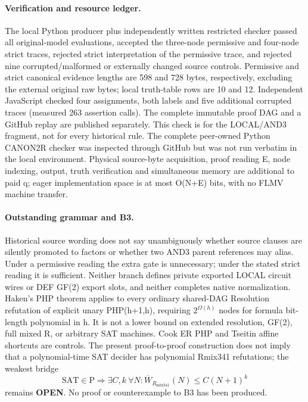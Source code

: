 \documentclass[11pt]{article}
\begin{document}
\paragraph{Verification and resource ledger.}
The local Python producer plus independently written restricted checker passed all original-model evaluations, accepted the three-node permissive and four-node strict traces, rejected strict interpretation of the permissive trace, and rejected nine corrupted/malformed or externally changed source controls. Permissive and strict canonical evidence lengths are 598 and 728 bytes, respectively, excluding the external original raw bytes; local truth-table rows are 10 and 12. Independent JavaScript checked four assignments, both labels and five additional corrupted traces (measured 263 assertion calls). The complete immutable proof DAG and a GitHub replay are published separately. This check is for the LOCAL/AND3 fragment, not for every historical rule. The complete peer-owned Python CANON2R checker was inspected through GitHub but was not run verbatim in the local environment. Physical source-byte acquisition, proof reading E, node indexing, output, truth verification and simultaneous memory are additional to paid q; eager implementation space is at most O(N+E) bits, with no FLMV machine transfer.

\paragraph{Outstanding grammar and B3.}
Historical source wording does not say unambiguously whether source clauses are silently promoted to factors or whether two AND3 parent references may alias. Under a permissive reading the extra gate is unnecessary; under the stated strict reading it is sufficient. Neither branch defines private exported LOCAL circuit wires or DEF GF(2) export slots, and neither completes native normalization. Haken's PHP theorem applies to every ordinary shared-DAG Resolution refutation of explicit unary PHP(h+1,h), requiring \(2^{\Omega(h)}\) nodes for formula bit-length polynomial in h. It is not a lower bound on extended resolution, GF(2), full mixed R, or arbitrary SAT machines. Cook ER PHP and Tseitin affine shortcuts are controls. The present proof-to-proof construction does not imply that a polynomial-time SAT decider has polynomial Rmix341 refutations; the weakest bridge
\[
\mathrm{SAT}\in\mathrm P\Longrightarrow
\exists C,k\ \forall N:\overline W_{R_{\mathrm{mix341}}}(N)\le C(N+1)^k
\]
remains \textbf{OPEN}. No proof or counterexample to B3 has been produced.
\end{document}

